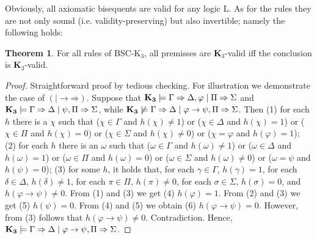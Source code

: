 \documentclass[11pt,a4paper,titlepage]{article}
\theoremstyle{definition}
\newtheorem{theorem}{\textbf{Theorem}}
\newcommand{\3}{\vspace{.3in}}
\newcommand{\2}{\vspace{.2in}}
\newcommand{\1}{\vspace{.1in}}
\newcommand{\5}{\vspace{.05in}}
\begin{document}
\1

Obviously, all axiomatic bisequents are valid for any logic L. As for the rules they are not only sound (i.e. validity-preserving) but also invertible; namely the following holds:

\begin{theorem}\label{Theorem1}
	For all rules of BSC-K$_3$, all premisses are {\bf K$_3$}-valid iff the conclusion is {\bf K$_3$}-valid.
\end{theorem}
\begin{proof}
Straightforward proof by tedious checking. For illustration we demonstrate the case of $(\mathord{\mid\rightarrow}\mathord{\Rightarrow})$. Suppose that ${\bf K_3}\models\Gamma\Rightarrow\Delta,\varphi \mid \Pi\Rightarrow\Sigma$ and ${\bf K_3}\models\Gamma\Rightarrow\Delta \mid \psi,\Pi\Rightarrow\Sigma$, while ${\bf K_3}\not\models\Gamma\Rightarrow\Delta \mid \varphi\rightarrow\psi,\Pi\Rightarrow\Sigma$. Then (1) for each $ h $ there is a $ \chi $ such that ($ \chi\in\Gamma $ and $ h(\chi)\not=1 $) or ($ \chi\in\Delta $ and $ h(\chi)=1 $) or ($ \chi\in\Pi $ and $ h(\chi)=0$) or ($ \chi\in\Sigma $ and $ h(\chi)\not=0 $) or ($ \chi=\varphi $ and $ h(\varphi)=1 $); (2) for each $ h $ there is an $ \omega $ such that ($ \omega\in\Gamma $ and $ h(\omega)\not=1 $) or ($ \omega\in\Delta $ and $ h(\omega)=1 $) or ($ \omega\in\Pi $ and $ h(\omega)=0$) or ($ \omega\in\Sigma $ and $ h(\omega)\not=0 $) or ($ \omega=\psi $ and $ h(\psi)=0 $); (3) for some $ h $, it holds that, for each $ \gamma\in\Gamma $, $h(\gamma)=1$, for each $ \delta\in\Delta $, $ h(\delta)\not=1 $, for each $ \pi\in\Pi $, $ h(\pi)\not=0 $, for each $ \sigma\in\Sigma $, $ h(\sigma)=0 $, and $ h(\varphi\rightarrow\psi)\not=0 $. From (1) and (3) we get (4) $ h(\varphi)=1 $. From (2) and (3) we get (5) $ h(\psi)=0 $. From (4) and (5) we obtain (6) $ h(\varphi\rightarrow\psi)=0 $. However, from (3) follows that $ h(\varphi\rightarrow\psi)\not=0 $. Contradiction. Hence, ${\bf K_3}\models\Gamma\Rightarrow\Delta \mid \varphi\rightarrow\psi,\Pi\Rightarrow\Sigma$.


\end{proof}
\end{document}
